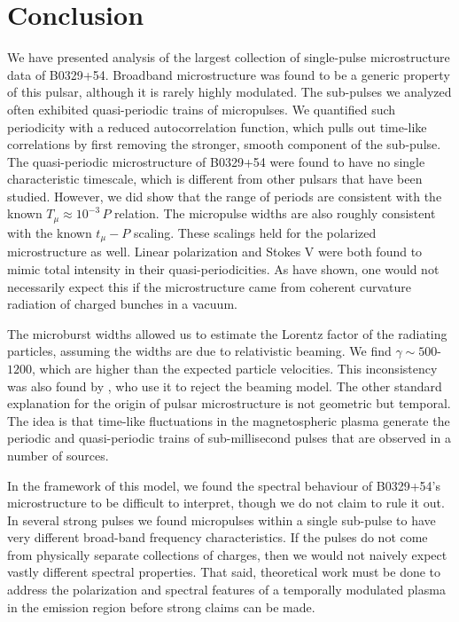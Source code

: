 


\section{Conclusion}
\label{sec:conclusion}
  
We have presented analysis of the largest collection 
of single-pulse microstructure data of 
B0329+54. Broadband microstructure was found to be a 
generic property of this pulsar, although it is
rarely highly modulated. The sub-pulses we analyzed often 
exhibited quasi-periodic trains of micropulses. We 
quantified such periodicity with a reduced autocorrelation 
function, which pulls out time-like correlations by 
first removing the stronger, smooth component of the 
sub-pulse. The quasi-periodic microstructure of B0329+54
were found to have no single characteristic timescale, which is
different from other pulsars that have been studied. 
However, we did show that the range of periods are 
consistent with the known $T_\mu \approx 10^{-3}\,P$ relation. 
The micropulse widths are also roughly consistent with 
the known $t_\mu-P$ scaling. These scalings held for 
the polarized microstructure as well. Linear polarization 
and Stokes V were both found to mimic total intensity in 
their quasi-periodicities. As \citet{2015ApJ...806..236M} 
have shown, one would not necessarily expect this 
if the microstructure came from 
coherent curvature radiation of charged bunches in a vacuum.

The microburst widths allowed us to estimate the Lorentz 
factor of the radiating particles, assuming the widths 
are due to relativistic beaming. We find $\gamma\sim500$-$1200$, 
which are higher than the expected particle velocities. 
This inconsistency was also found by \citet{1998A&A...332..111L}, 
who use it to reject the beaming model. The other standard 
explanation for the origin of pulsar microstructure is not 
geometric but temporal. The idea is that time-like 
fluctuations in the magnetospheric plasma generate the 
periodic and quasi-periodic trains of sub-millisecond pulses
that are observed in a number of sources. 

In the framework of this model, we found the spectral 
behaviour of B0329+54's microstructure to be difficult
to interpret, though we do not claim to 
rule it out. In several strong pulses we found 
micropulses within a single sub-pulse to have very different 
broad-band frequency characteristics. If the pulses 
do not come from physically separate collections of 
charges, then we would not naively expect vastly different 
spectral properties. That said, theoretical work must be 
done to address the polarization and spectral features of 
a temporally modulated plasma in the emission region 
before strong claims can be made.




